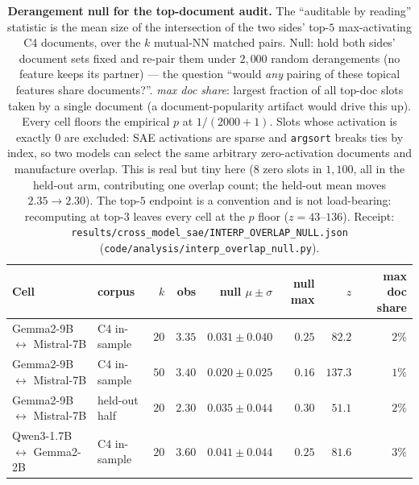 \begin{table}[h]
\centering
\caption{\textbf{Derangement null for the top-document audit.} The ``auditable by reading''
statistic is the mean size of the intersection of the two sides' top-$5$ max-activating C4
documents, over the $k$ mutual-NN matched pairs. Null: hold both sides' document sets fixed
and re-pair them under $2{,}000$ random derangements (no feature keeps its partner) --- the
question ``would \emph{any} pairing of these topical features share documents?''. \emph{max
doc share}: largest fraction of all top-doc slots taken by a single document (a
document-popularity artifact would drive this up). Every cell floors the empirical $p$ at
$1/(2000{+}1)$. Slots whose activation is exactly $0$ are excluded: SAE activations are
sparse and \texttt{argsort} breaks ties by index, so two models can select the same
arbitrary zero-activation documents and manufacture overlap. This is real but tiny here
($8$ zero slots in $1{,}100$, all in the held-out arm, contributing one overlap count;
the held-out mean moves $2.35\to2.30$). The top-$5$ endpoint is a convention and is not
load-bearing: recomputing at top-$3$ leaves every cell at the $p$ floor
($z=43$--$136$). Receipt:
\texttt{results/cross\_model\_sae/INTERP\_OVERLAP\_NULL.json}
(\texttt{code/analysis/interp\_overlap\_null.py}).}
\label{tab:interp_null}
\footnotesize
\setlength{\tabcolsep}{3.5pt}
\begin{tabular}{llrrrrrr}
\toprule
Cell & corpus & $k$ & obs & null $\mu{\pm}\sigma$ & null max & $z$ & max doc share \\
\midrule
Gemma2-9B $\leftrightarrow$ Mistral-7B & C4 in-sample & $20$ & $3.35$ & $0.031{\pm}0.040$ & $0.25$ & $82.2$ & $2\%$ \\
Gemma2-9B $\leftrightarrow$ Mistral-7B & C4 in-sample & $50$ & $3.40$ & $0.020{\pm}0.025$ & $0.16$ & $137.3$ & $1\%$ \\
Gemma2-9B $\leftrightarrow$ Mistral-7B & held-out half & $20$ & $2.30$ & $0.035{\pm}0.044$ & $0.30$ & $51.1$ & $2\%$ \\
Qwen3-1.7B $\leftrightarrow$ Gemma2-2B & C4 in-sample & $20$ & $3.60$ & $0.041{\pm}0.044$ & $0.25$ & $81.6$ & $3\%$ \\
\bottomrule
\end{tabular}
\end{table}

